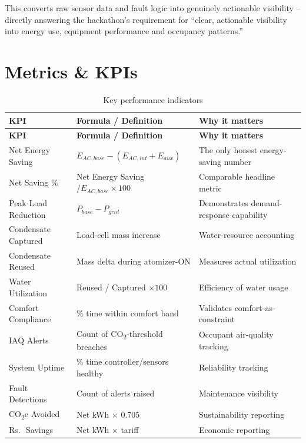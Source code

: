 \documentclass[11pt,a4paper]{article}
\newcommand{\textrupee}{Rs.\,}
\begin{document}
This converts raw sensor data and fault logic into genuinely actionable visibility -- directly answering the hackathon's requirement for ``clear, actionable visibility into energy use, equipment performance and occupancy patterns.''

\section{Metrics \& KPIs}

\begin{longtable}{p{3.2cm}p{5cm}p{5.8cm}}
\caption{Key performance indicators} \\
\toprule
\textbf{KPI} & \textbf{Formula / Definition} & \textbf{Why it matters} \\
\midrule
\endfirsthead
\toprule
\textbf{KPI} & \textbf{Formula / Definition} & \textbf{Why it matters} \\
\midrule
\endhead
Net Energy Saving & $E_{AC,base} - (E_{AC,int} + E_{aux})$ & The only honest energy-saving number \\
Net Saving \% & Net Energy Saving $/ E_{AC,base} \times 100$ & Comparable headline metric \\
Peak Load Reduction & $P_{base} - P_{grid}$ & Demonstrates demand-response capability \\
Condensate Captured & Load-cell mass increase & Water-resource accounting \\
Condensate Reused & Mass delta during atomizer-ON & Measures actual utilization \\
Water Utilization & Reused / Captured $\times 100$ & Efficiency of water usage \\
Comfort Compliance & \% time within comfort band & Validates comfort-as-constraint \\
IAQ Alerts & Count of CO\textsubscript{2}-threshold breaches & Occupant air-quality tracking \\
System Uptime & \% time controller/sensors healthy & Reliability tracking \\
Fault Detections & Count of alerts raised & Maintenance visibility \\
CO\textsubscript{2}e Avoided & Net kWh $\times$ 0.705 & Sustainability reporting \\
\textrupee\ Savings & Net kWh $\times$ tariff & Economic reporting \\
\bottomrule
\end{longtable}
\end{document}
